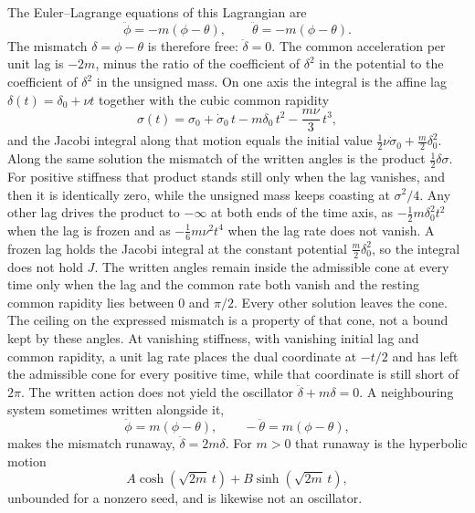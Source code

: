 \documentclass[a4paper]{article}
\begin{document}
The Euler--Lagrange equations of this Lagrangian are
\[
\ddot\phi=-m(\phi-\theta),\qquad \ddot\theta=-m(\phi-\theta).
\]
The mismatch $\delta=\phi-\theta$ is therefore free: $\ddot\delta=0$. The common acceleration per unit lag is $-2m$, minus the ratio of the coefficient of \(\delta^2\) in the potential to the coefficient of \(\delta^2\) in the unsigned mass. On one axis the integral is the affine lag $\delta(t)=\delta_0+\nu t$ together with the cubic common rapidity
\[
\sigma(t)=\sigma_0+\dot\sigma_0\,t-m\delta_0\,t^2-\frac{m\nu}{3}\,t^3,
\]
and the Jacobi integral along that motion equals the initial value $\tfrac12\nu\dot\sigma_0+\tfrac m2\delta_0^2$. Along the same solution the mismatch of the written angles is the product $\tfrac12\delta\sigma$. For positive stiffness that product stands still only when the lag vanishes, and then it is identically zero, while the unsigned mass keeps coasting at $\sigma^2/4$. Any other lag drives the product to $-\infty$ at both ends of the time axis, as $-\tfrac12 m\delta_0^2 t^2$ when the lag is frozen and as $-\tfrac16 m\nu^2 t^4$ when the lag rate does not vanish. A frozen lag holds the Jacobi integral at the constant potential $\tfrac m2\delta_0^2$, so the integral does not hold $J$. The written angles remain inside the admissible cone at every time only when the lag and the common rate both vanish and the resting common rapidity lies between $0$ and $\pi/2$. Every other solution leaves the cone. The ceiling on the expressed mismatch is a property of that cone, not a bound kept by these angles. At vanishing stiffness, with vanishing initial lag and common rapidity, a unit lag rate places the dual coordinate at $-t/2$ and has left the admissible cone for every positive time, while that coordinate is still short of $2\pi$. The written action does not yield the oscillator $\ddot\delta+m\delta=0$. A neighbouring system sometimes written alongside it,
\[
\ddot\phi=m(\phi-\theta),\qquad -\ddot\theta=m(\phi-\theta),
\]
makes the mismatch runaway, $\ddot\delta=2m\delta$. For $m>0$ that runaway is the hyperbolic motion
\[
A\cosh(\sqrt{2m}\,t)+B\sinh(\sqrt{2m}\,t),
\]
unbounded for a nonzero seed, and is likewise not an oscillator.
\end{document}
